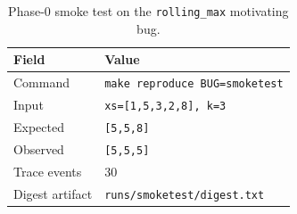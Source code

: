 
\begin{table}[t]
\centering
\caption{Phase-0 smoke test on the \texttt{rolling\_max} motivating bug.}
\label{tab:smoketest}
\begin{tabular}{@{}ll@{}}
\toprule
Field & Value \\
\midrule
Command & \texttt{make reproduce BUG=smoketest} \\
Input & \texttt{xs=[1,5,3,2,8], k=3} \\
Expected & \texttt{[5,5,8]} \\
Observed & \texttt{[5,5,5]} \\
Trace events & 30 \\
Digest artifact & \texttt{runs/smoketest/digest.txt} \\
\bottomrule
\end{tabular}
\end{table}

